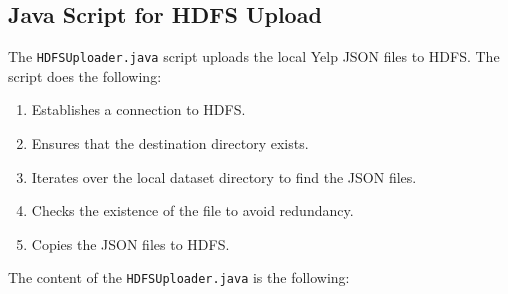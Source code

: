 \documentclass[conference]{IEEEtran}
\begin{document}
\subsection{Java Script for HDFS Upload}

The \texttt{HDFSUploader.java} script uploads the local Yelp JSON files to HDFS.
The script does the following:
\begin{enumerate}
    \item Establishes a connection to HDFS.
    \item Ensures that the destination directory exists.
    \item Iterates over the local dataset directory to find the JSON files.
    \item Checks the existence of the file to avoid redundancy.
    \item Copies the JSON files to HDFS.
\end{enumerate}
The content of the \texttt{HDFSUploader.java} is the following:
\end{document}
